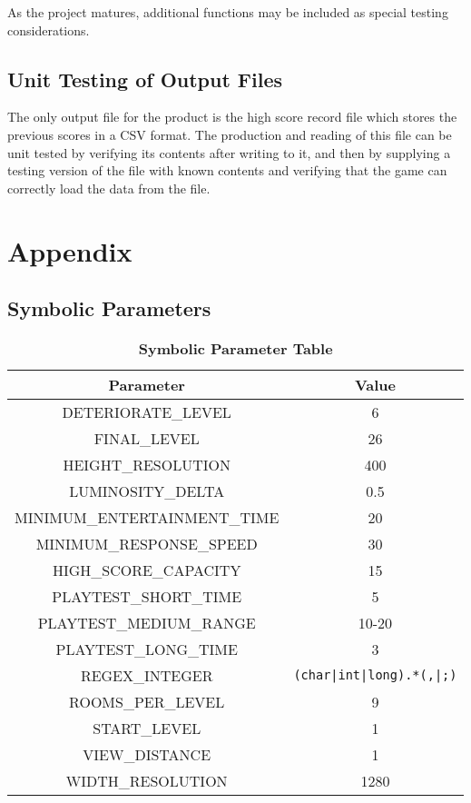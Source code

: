 \documentclass[12pt, titlepage]{article}
\newcommand{\rev}[1]{\textcolor{RevisionColour}{#1}}
\begin{document}
		As the project matures, additional functions may be included as special testing considerations.

	\subsection{Unit Testing of Output Files}
		The only output file for the product is the high score record file which stores the previous scores in a CSV format.  The production and reading of this file can be unit tested by verifying its contents after writing to it, and then by supplying a testing version of the file with known contents and verifying that the game can correctly load the data from the file.

\newpage





\newpage
\section{Appendix}
\label{section7}

	\subsection{Symbolic Parameters}

		\begin{table}[h!]
			\centering
			\caption{\textbf{Symbolic Parameter Table}}
			\label{symbolicParameters}
			\bigskip
			\def\arraystretch{1.6}


			\begin{tabular}{| c | c |}
				\bottomrule
				\textbf{Parameter} & \textbf{Value} \\
				\hline
				\rev{DETERIORATE\_LEVEL} & \rev{6} \\
				FINAL\_LEVEL & 26 \\
				HEIGHT\_RESOLUTION & 400 \\
				LUMINOSITY\_DELTA & 0.5 \\
				MINIMUM\_ENTERTAINMENT\_TIME & 20 \\
				MINIMUM\_RESPONSE\_SPEED & 30 \\
				HIGH\_SCORE\_CAPACITY & 15 \\
				PLAYTEST\_SHORT\_TIME & 5 \\
				PLAYTEST\_MEDIUM\_RANGE & 10-20 \\
				PLAYTEST\_LONG\_TIME & 3 \\
				REGEX\_INTEGER & \lstinline$(char|int|long).*(,|;)$ \\
				ROOMS\_PER\_LEVEL & 9 \\
				START\_LEVEL & 1 \\
				VIEW\_DISTANCE & 1 \\
				WIDTH\_RESOLUTION & 1280 \\
				\toprule
			\end{tabular}
		\end{table}
\end{document}
